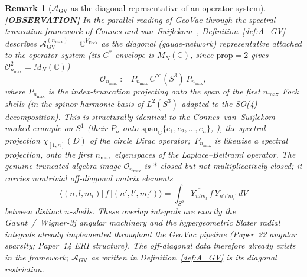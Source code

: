 \documentclass[11pt]{article}
\newtheorem{remark}{Remark}
\begin{document}
\begin{remark}[$\mathcal{A}_{\mathrm{GV}}$ as the diagonal representative of an operator system]
\label{rem:operator_system}
\textbf{[OBSERVATION]} In the parallel reading of GeoVac through the spectral-truncation
framework of Connes and van~Suijlekom~\cite{connes_vs2021},
Definition~\ref{def:A_GV} describes
$\mathcal{A}_{\mathrm{GV}}^{(n_{\max})} = \mathbb{C}^{V_{\mathrm{Fock}}}$
as the diagonal (gauge-network) representative attached to the operator
system (its $C^*$-envelope is $M_N(\mathbb{C})$, since $\mathrm{prop} = 2$
gives $\mathcal{O}_{n_{\max}}^2 = M_N(\mathbb{C})$)
\[
   \mathcal{O}_{n_{\max}} := P_{n_{\max}} \, C^\infty(S^3) \, P_{n_{\max}},
\]
where $P_{n_{\max}}$ is the index-truncation projecting onto the
span of the first $n_{\max}$ Fock shells (in the spinor-harmonic
basis of $L^2(S^3)$ adapted to the SO(4) decomposition).  This is
structurally identical to the Connes--van~Suijlekom worked example
on $S^1$ (their $P_n$ onto $\mathrm{span}_{\mathbb{C}}\{e_1, e_2,
\ldots, e_n\}$, \cite[\S 3.1]{connes_vs2021}), the spectral
projection $\chi_{[1, n]}(D)$ of the circle Dirac operator;\
$P_{n_{\max}}$ is likewise a spectral projection, onto the first
$n_{\max}$ eigenspaces of the Laplace--Beltrami operator.  The genuine truncated algebra-image
$\mathcal{O}_{n_{\max}}$ is $*$-closed but \emph{not} multiplicatively
closed; it carries nontrivial off-diagonal matrix elements
\[
   \langle (n,l,m_l) | \, f \, | (n', l', m_l') \rangle
   = \int_{S^3} \overline{Y_{n l m_l}}\, f \, Y_{n' l' m_l'}\, dV
\]
between distinct $n$-shells.  These overlap integrals are exactly
the Gaunt~/~Wigner-3j angular machinery and the hypergeometric
Slater radial integrals already implemented throughout the GeoVac
pipeline (Paper~22 angular sparsity; Paper~14 ERI structure).  The
off-diagonal data therefore already exists in the framework;
$\mathcal{A}_{\mathrm{GV}}$ as written in Definition~\ref{def:A_GV}
is its diagonal restriction.


\end{remark}
\end{document}
